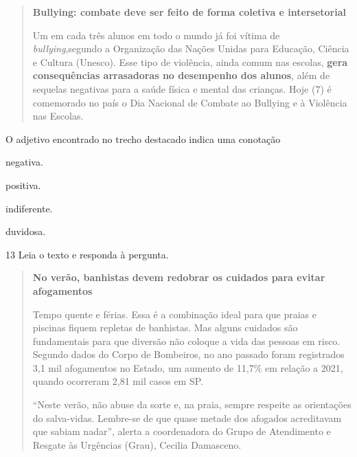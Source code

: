 \begin{quote}
\textbf{Bullying: combate deve ser feito de forma coletiva e intersetorial}

Um em cada três alunos em todo o mundo já foi vítima de
\textit{bullying},segundo a Organização das Nações Unidas para Educação,
Ciência e Cultura (Unesco). Esse tipo de violência, ainda comum nas
escolas, \textbf{gera consequências arrasadoras no desempenho dos alunos},
além de sequelas negativas para a saúde física e mental das crianças.
Hoje (7) é comemorado no país o Dia Nacional de Combate ao Bullying e à
Violência nas Escolas.

\end{quote}

O adjetivo encontrado no trecho destacado indica uma conotação

\begin{escolha}
  \item negativa.

  \item positiva.

  \item indiferente.

  \item duvidosa.
\end{escolha}


\num{13} Leia o texto e responda à pergunta.

\begin{quote}
\textbf{No verão, banhistas devem redobrar os cuidados para evitar
afogamentos}

Tempo quente e férias. Essa é a combinação ideal para que praias e
piscinas fiquem repletas de banhistas. Mas alguns cuidados são
fundamentais para que diversão não coloque a vida das pessoas em risco.
Segundo dados do Corpo de Bombeiros, no ano passado foram registrados
3,1 mil afogamentos no Estado, um aumento de 11,7\% em relação a 2021,
quando ocorreram 2,81 mil casos em SP.

``Neste verão, não abuse da sorte e, na praia, sempre respeite as
orientações do salva-vidas. Lembre-se de que quase metade dos afogados
acreditavam que sabiam nadar'', alerta a coordenadora do Grupo de
Atendimento e Resgate às Urgências (Grau), Cecilia Damasceno.
\end{quote}

